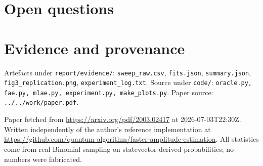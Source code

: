 \documentclass[11pt]{article}
\begin{document}
\section{Open questions}



\section{Evidence and provenance}

Artefacts under \texttt{report/evidence/}: \texttt{sweep\_raw.csv}, \texttt{fits.json}, \texttt{summary.json}, \texttt{fig3\_replication.png}, \texttt{experiment\_log.txt}. Source under \texttt{code/}: \texttt{oracle.py, fae.py, mlae.py, experiment.py, make\_plots.py}. Paper source: \texttt{../../work/paper.pdf}.

Paper fetched from \url{https://arxiv.org/pdf/2003.02417} at 2026-07-03T22:30Z. Written independently of the author's reference implementation at \url{https://github.com/quantum-algorithm/faster-amplitude-estimation}. All statistics come from real Binomial sampling on statevector-derived probabilities; no numbers were fabricated.
\end{document}
